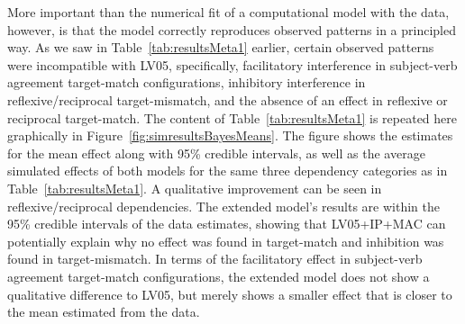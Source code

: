 \documentclass{cambridge7A}\usepackage[]{graphicx}\usepackage[]{color}
\begin{document}
More important than the numerical fit of a computational model with the data, however, is that the model correctly reproduces observed patterns in a principled way. As we saw in Table~\ref{tab:resultsMeta1} earlier, certain observed patterns were incompatible with LV05, specifically, facilitatory interference in subject-verb agreement target-match configurations, inhibitory interference in reflexive/reciprocal target-mismatch, and the absence of an effect in reflexive or reciprocal target-match.
The content of Table~\ref{tab:resultsMeta1} is repeated here graphically in Figure~\ref{fig:simresultsBayesMeans}. The figure shows the estimates for the mean effect  along with 95\% credible intervals, as well as the average simulated effects of both models for the same three dependency categories as in Table~\ref{tab:resultsMeta1}.
A qualitative improvement can be seen in reflexive/reciprocal dependencies. The extended model's results are within the 95\% credible intervals of the data estimates, showing that LV05+IP+MAC can potentially explain why no effect was found in target-match and inhibition was found in target-mismatch.
In terms of the facilitatory effect in subject-verb agreement target-match configurations, the extended model does not show a qualitative difference to LV05, but merely shows a smaller effect that is closer to the mean estimated from the data.
\end{document}
